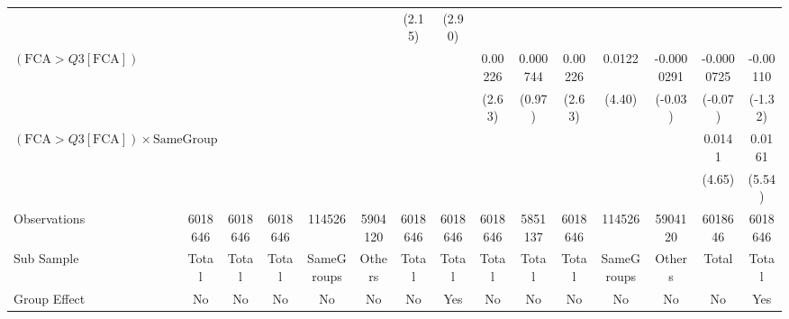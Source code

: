 {\begin{tabular}{l*{14}{c}}
                &                  &                  &                  &                  &                  &   (2.15)         &   (2.90)         &                  &                  &                  &                  &                  &                  &                  \\
[1em]
 $ (\text{FCA} > Q3[\text{FCA}]) $ &                  &                  &                  &                  &                  &                  &                  &  0.00226\sym{*}  & 0.000744         &  0.00226\sym{*}  &   0.0122\sym{***}&-0.0000291         &-0.0000725         & -0.00110         \\
                &                  &                  &                  &                  &                  &                  &                  &   (2.63)         &   (0.97)         &   (2.63)         &   (4.40)         &  (-0.03)         &  (-0.07)         &  (-1.32)         \\
[1em]
 $ (\text{FCA} > Q3[\text{FCA}]) \times  {\text{SameGroup} }  $ &                  &                  &                  &                  &                  &                  &                  &                  &                  &                  &                  &                  &   0.0141\sym{***}&   0.0161\sym{***}\\
                &                  &                  &                  &                  &                  &                  &                  &                  &                  &                  &                  &                  &   (4.65)         &   (5.54)         \\
\hline
Observations    &  6018646         &  6018646         &  6018646         &   114526         &  5904120         &  6018646         &  6018646         &  6018646         &  5851137         &  6018646         &   114526         &  5904120         &  6018646         &  6018646         \\
Sub Sample      &    Total         &    Total         &    Total         &SameGroups         &   Others         &    Total         &    Total         &    Total         &    Total         &    Total         &SameGroups         &   Others         &    Total         &    Total         \\
Group Effect    &       No         &       No         &       No         &       No         &       No         &       No         &      Yes         &       No         &       No         &       No         &       No         &       No         &       No         &      Yes         \\

\end{tabular}}
